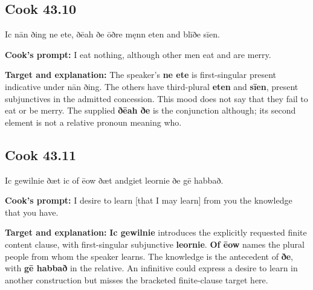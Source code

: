 \par\begin{minipage}{\linewidth}\raggedright
\subsection*{Cook 43.10}

Ic nān ðing ne ete, ðēah ðe ōðre męnn eten and blīðe sīen.

\textbf{Cook's prompt:} I eat nothing, although other men eat and are merry.

\textbf{Target and explanation:} The speaker's \textbf{ne ete} is first-singular present indicative under nān ðing. The others have third-plural \textbf{eten} and \textbf{sīen}, present subjunctives in the admitted concession. This mood does not say that they fail to eat or be merry. The supplied \textbf{ðēah ðe} is the conjunction although; its second element is not a relative pronoun meaning who.

\end{minipage}\par\addvspace{4pt}

\par\begin{minipage}{\linewidth}\raggedright
\subsection*{Cook 43.11}

Ic gewilnie ðæt ic of ēow ðæt andgiet leornie ðe gē habbað.

\textbf{Cook's prompt:} I desire to learn [that I may learn] from you the knowledge that you have.

\textbf{Target and explanation:} \textbf{Ic gewilnie} introduces the explicitly requested finite content clause, with first-singular subjunctive \textbf{leornie}. \textbf{Of ēow} names the plural people from whom the speaker learns. The knowledge is the antecedent of \textbf{ðe}, with \textbf{gē habbað} in the relative. An infinitive could express a desire to learn in another construction but misses the bracketed finite-clause target here.

\end{minipage}\par\addvspace{4pt}

